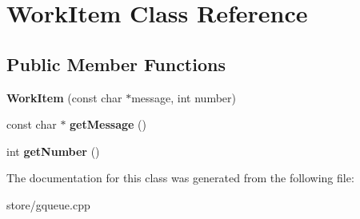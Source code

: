 \hypertarget{classWorkItem}{}\section{Work\+Item Class Reference}
\label{classWorkItem}
\subsection*{Public Member Functions}
\begin{DoxyCompactItemize}
\item 
{\bfseries Work\+Item} (const char $\ast$message, int number)\hypertarget{classWorkItem_ac77d1e967d872c2ceb4de4ea3ac45c78}{}\label{classWorkItem_ac77d1e967d872c2ceb4de4ea3ac45c78}

\item 
const char $\ast$ {\bfseries get\+Message} ()\hypertarget{classWorkItem_a5e25f8c72fd1213c9e975c988e2a96c4}{}\label{classWorkItem_a5e25f8c72fd1213c9e975c988e2a96c4}

\item 
int {\bfseries get\+Number} ()\hypertarget{classWorkItem_a9741f02d319a3843b62ec72b9181f71c}{}\label{classWorkItem_a9741f02d319a3843b62ec72b9181f71c}

\end{DoxyCompactItemize}


The documentation for this class was generated from the following file\+:\begin{DoxyCompactItemize}
\item 
store/gqueue.\+cpp\end{DoxyCompactItemize}
